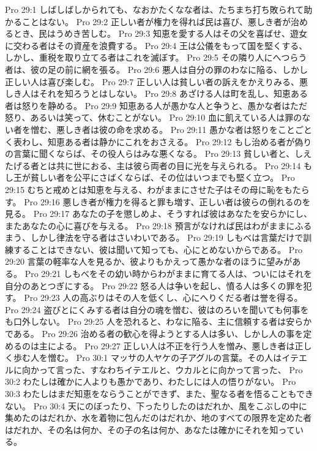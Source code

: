 Pro 29:1  しばしばしかられても、なおかたくなな者は、たちまち打ち敗られて助かることはない。
Pro 29:2  正しい者が権力を得れば民は喜び、悪しき者が治めるとき、民はうめき苦しむ。
Pro 29:3  知恵を愛する人はその父を喜ばせ、遊女に交わる者はその資産を浪費する。
Pro 29:4  王は公儀をもって国を堅くする、しかし、重税を取り立てる者はこれを滅ぼす。
Pro 29:5  その隣り人にへつらう者は、彼の足の前に網を張る。
Pro 29:6  悪人は自分の罪のわなに陥る、しかし正しい人は喜び楽しむ。
Pro 29:7  正しい人は貧しい者の訴えをかえりみる、悪しき人はそれを知ろうとはしない。
Pro 29:8  あざける人は町を乱し、知恵ある者は怒りを静める。
Pro 29:9  知恵ある人が愚かな人と争うと、愚かな者はただ怒り、あるいは笑って、休むことがない。
Pro 29:10  血に飢えている人は罪のない者を憎む、悪しき者は彼の命を求める。
Pro 29:11  愚かな者は怒りをことごとく表わし、知恵ある者は静かにこれをおさえる。
Pro 29:12  もし治める者が偽りの言葉に聞くならば、その役人らはみな悪くなる。
Pro 29:13  貧しい者と、しえたげる者とは共に世におる、主は彼ら両者の目に光を与えられる。
Pro 29:14  もし王が貧しい者を公平にさばくならば、その位はいつまでも堅く立つ。
Pro 29:15  むちと戒めとは知恵を与える、わがままにさせた子はその母に恥をもたらす。
Pro 29:16  悪しき者が権力を得ると罪も増す、正しい者は彼らの倒れるのを見る。
Pro 29:17  あなたの子を懲しめよ、そうすれば彼はあなたを安らかにし、またあなたの心に喜びを与える。
Pro 29:18  預言がなければ民はわがままにふるまう、しかし律法を守る者はさいわいである。
Pro 29:19  しもべは言葉だけで訓練することはできない、彼は聞いて知っても、心にとめないからである。
Pro 29:20  言葉の軽率な人を見るか、彼よりもかえって愚かな者のほうに望みがある。
Pro 29:21  しもべをその幼い時からわがままに育てる人は、ついにはそれを自分のあとつぎにする。
Pro 29:22  怒る人は争いを起し、憤る人は多くの罪を犯す。
Pro 29:23  人の高ぶりはその人を低くし、心にへりくだる者は誉を得る。
Pro 29:24  盗びとにくみする者は自分の魂を憎む、彼はのろいを聞いても何事をも口外しない。
Pro 29:25  人を恐れると、わなに陥る、主に信頼する者は安らかである。
Pro 29:26  治める者の歓心を得ようとする人は多い、しかし人の事を定めるのは主による。
Pro 29:27  正しい人は不正を行う人を憎み、悪しき者は正しく歩む人を憎む。
Pro 30:1  マッサの人ヤケの子アグルの言葉。その人はイテエルに向かって言った、すなわちイテエルと、ウカルとに向かって言った、
Pro 30:2  わたしは確かに人よりも愚かであり、わたしには人の悟りがない。
Pro 30:3  わたしはまだ知恵をならうことができず、また、聖なる者を悟ることもできない。
Pro 30:4  天にのぼったり、下ったりしたのはだれか、風をこぶしの中に集めたのはだれか、水を着物に包んだのはだれか、地のすべての限界を定めた者はだれか、その名は何か、その子の名は何か、あなたは確かにそれを知っている。
